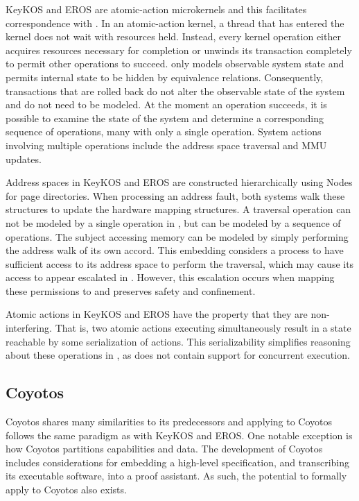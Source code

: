 KeyKOS and EROS are atomic-action microkernels and this facilitates correspondence with \TMmodelName{}.
In an atomic-action kernel, a thread that has entered the kernel does not wait with resources held.
Instead, every kernel operation either acquires resources necessary for completion or unwinds its transaction completely to permit other operations to succeed.
\TMmodelName{} only models observable system state and permits internal state to be hidden by equivalence relations.
Consequently, transactions that are rolled back do not alter the observable state of the system and do not need to be modeled.
At the moment an operation succeeds, it is possible to examine the state of the system and determine a corresponding sequence of \TMmodelName{} operations, many with only a single operation.
System actions involving multiple \TMmodelName{} operations include the address space traversal and MMU updates.

Address spaces in KeyKOS and EROS are constructed hierarchically using Nodes for page directories.
When processing an address fault, both systems walk these structures to update the hardware mapping structures.
A traversal operation can not be modeled by a single operation in \TMmodelName{}, but can be modeled by a sequence of operations.
The subject accessing memory can be modeled by simply performing the address walk of its own accord.
This embedding considers a process to have sufficient access to its address space to perform the traversal, which may cause its access to appear escalated in \TMmodelName{}.
However, this escalation occurs when mapping these permissions to \TMmodelName{} \TMaccessRights{} and preserves safety and confinement.

Atomic actions in KeyKOS and EROS have the property that they are non-interfering.
That is, two atomic actions executing simultaneously result in a state reachable by some serialization of actions.
This serializability simplifies reasoning about these operations in \TMmodelName{}, as \TMmodelName{} does not contain support for concurrent execution.

\subsection{Coyotos}

Coyotos shares many similarities to its predecessors and applying \TMmodelName{} to Coyotos follows the same paradigm as with KeyKOS and EROS.
One notable exception is how Coyotos partitions capabilities and data.
The development of Coyotos includes considerations for embedding a high-level specification, and transcribing its executable software, into a proof assistant.
As such, the potential to formally apply \TMmodelName{} to Coyotos also exists.

